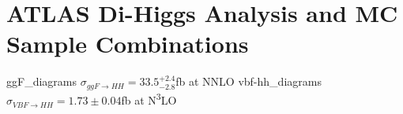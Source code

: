 \section{ATLAS Di-Higgs Analysis and MC Sample Combinations}

{ggF_diagrams}
{$\sigma_{ggF \rightarrow HH}=33.5^{+2.4}_{-2.8}$fb at NNLO}
{vbf-hh_diagrams}
{$\sigma_{VBF \rightarrow HH}=1.73\pm0.04$fb at N\textsuperscript{3}LO}

